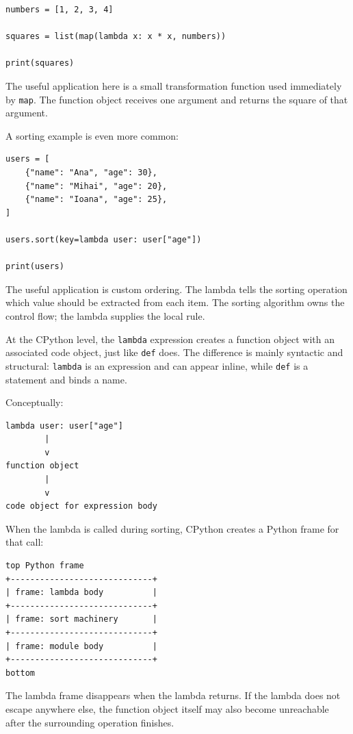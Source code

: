 \begin{verbatim}
numbers = [1, 2, 3, 4]

squares = list(map(lambda x: x * x, numbers))

print(squares)
\end{verbatim}

The useful application here is a small transformation function used immediately by \texttt{map}. The function object receives one argument and returns the square of that argument.

A sorting example is even more common:

\begin{verbatim}
users = [
    {"name": "Ana", "age": 30},
    {"name": "Mihai", "age": 20},
    {"name": "Ioana", "age": 25},
]

users.sort(key=lambda user: user["age"])

print(users)
\end{verbatim}

The useful application is custom ordering. The lambda tells the sorting operation which value should be extracted from each item. The sorting algorithm owns the control flow; the lambda supplies the local rule.

At the CPython level, the \texttt{lambda} expression creates a function object with an associated code object, just like \texttt{def} does. The difference is mainly syntactic and structural: \texttt{lambda} is an expression and can appear inline, while \texttt{def} is a statement and binds a name.

Conceptually:

\begin{verbatim}
lambda user: user["age"]
        |
        v
function object
        |
        v
code object for expression body
\end{verbatim}

When the lambda is called during sorting, CPython creates a Python frame for that call:

\begin{verbatim}
top Python frame
+-----------------------------+
| frame: lambda body          |
+-----------------------------+
| frame: sort machinery       |
+-----------------------------+
| frame: module body          |
+-----------------------------+
bottom
\end{verbatim}

The lambda frame disappears when the lambda returns. If the lambda does not escape anywhere else, the function object itself may also become unreachable after the surrounding operation finishes.

